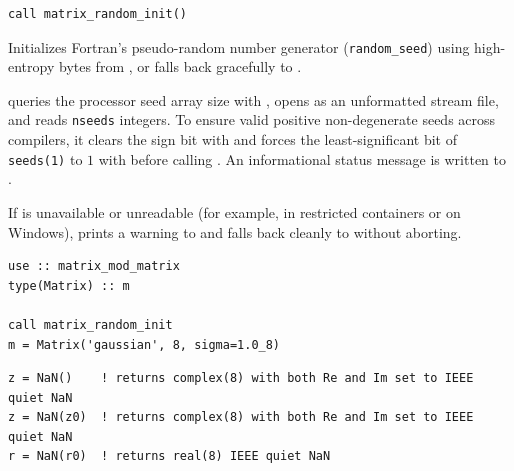 \lstset{language=[95]Fortran}
\begin{lstlisting}
call matrix_random_init()
\end{lstlisting}

Initializes Fortran's pseudo-random number generator (\texttt{random\_seed}) using high-entropy bytes from , or falls back gracefully to .

 queries the processor seed array size with , opens  as an unformatted stream file, and reads \texttt{nseeds} integers. To ensure valid positive non-degenerate seeds across compilers, it clears the sign bit with  and forces the least-significant bit of \texttt{seeds(1)} to $1$ with  before calling . An informational status message is written to .

If  is unavailable or unreadable (for example, in restricted containers or on Windows),  prints a warning to  and falls back cleanly to  without aborting.

\begin{description}[leftmargin=2.2cm, style=nextline]
\end{description}

\lstset{language=[95]Fortran}
\begin{lstlisting}
use :: matrix_mod_matrix
type(Matrix) :: m

call matrix_random_init
m = Matrix('gaussian', 8, sigma=1.0_8)
\end{lstlisting}


\lstset{language=[95]Fortran}
\begin{lstlisting}
z = NaN()    ! returns complex(8) with both Re and Im set to IEEE quiet NaN
z = NaN(z0)  ! returns complex(8) with both Re and Im set to IEEE quiet NaN
r = NaN(r0)  ! returns real(8) IEEE quiet NaN
\end{lstlisting}

